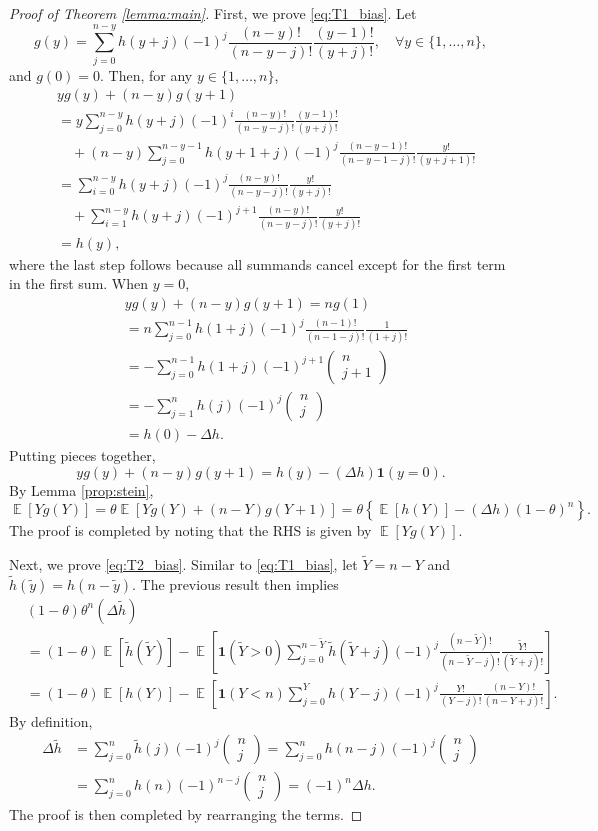 \documentclass[12pt,letterpaper]{article}
\newcommand{\com}[2]{
  \left(\begin{array}{cc}
    #1 \\ #2
  \end{array}\right)
}
\newcommand{\td}{\tilde}
\newcommand{\E}{\operatorname{\mathbb{E}}}
\begin{document}
\begin{proof}[Proof of Theorem \ref{lemma:main}]
  First, we prove \eqref{eq:T1_bias}. Let
    \[g(y) = \sum_{j=0}^{n-y}h(y + j)(-1)^{j}\frac{(n-y)!}{(n-y-j)!}\frac{(y-1)!}{(y+j)!}, \quad \forall y \in \{1, \ldots, n\},\]
    and $g(0) = 0$. Then, for any $y\in \{1, \ldots, n\}$,
    \begin{align*}
      &yg(y) + (n - y)g(y+1) \\
      & = y\sum_{j=0}^{n-y}h(y + j)(-1)^{i}\frac{(n-y)!}{(n-y-j)!}\frac{(y-1)!}{(y+j)!}\\
      & \quad + (n-y)\sum_{j=0}^{n-y-1}h(y +1 + j)(-1)^{j}\frac{(n-y-1)!}{(n-y-1-j)!}\frac{y!}{(y+j+1)!}\\
      & = \sum_{i=0}^{n-y}h(y + j)(-1)^{j}\frac{(n-y)!}{(n-y-j)!}\frac{y!}{(y+j)!}\\
      & \quad + \sum_{i=1}^{n-y}h(y + j)(-1)^{j+1}\frac{(n-y)!}{(n-y-j)!}\frac{y!}{(y+j)!}\\
      & = h(y),
    \end{align*}
    where the last step follows because all summands cancel except for the first term in the first sum. When $y = 0$,
    \begin{align*}
      &yg(y) + (n - y)g(y+1) = ng(1)\\
      & = n\sum_{j=0}^{n-1}h(1 + j)(-1)^{j}\frac{(n-1)!}{(n-1-j)!}\frac{1}{(1+j)!}\\
      & = -\sum_{j=0}^{n-1}h(1 + j)(-1)^{j+1}\com{n}{j+1}\\
      & = -\sum_{j=1}^{n}h(j)(-1)^{j}\com{n}{j}\\
      & = h(0) - \Delta h.
    \end{align*}
    Putting pieces together,
    \[yg(y) + (n - y)g(y+1) = h(y) - (\Delta h) \mathbf{1}(y = 0).\]
  By Lemma \ref{prop:stein},
  \[\E[Yg(Y)] = \theta \E[Yg(Y) + (n - Y)g(Y+1)] = \theta \left\{\E[h(Y)] - (\Delta h) (1 - \theta)^n\right\}.\]
  The proof is completed by noting that the RHS is given by $\E[Yg(Y)]$.

  Next, we prove \eqref{eq:T2_bias}. Similar to \eqref{eq:T1_bias}, let $\td{Y} = n - Y$ and $\td{h}(\td{y}) = h(n - \td{y})$. The previous result then implies
  \begin{align*}
    &(1 - \theta) \theta^n (\Delta \td{h})\\
    &= (1 - \theta) \E[\td{h}(\td{Y})] - \E\left[\mathbf{1}(\td{Y} > 0)\sum_{j=0}^{n-\td{Y}}\td{h}(\td{Y} + j)(-1)^{j}\frac{(n-\td{Y})!}{(n-\td{Y}-j)!}\frac{\td{Y}!}{(\td{Y}+j)!}\right]\\
    & = (1 - \theta) \E[h(Y)] - \E\left[\mathbf{1}(Y < n)\sum_{j=0}^{Y}h(Y - j)(-1)^{j}\frac{Y!}{(Y-j)!}\frac{(n - Y)!}{(n-Y+j)!}\right].
  \end{align*}
  By definition,
  \begin{align*}
    \Delta \td{h} &= \sum_{j=0}^{n}\td{h}(j)(-1)^{j}\com{n}{j} = \sum_{j=0}^{n}h(n-j)(-1)^{j}\com{n}{j}\\
    & = \sum_{j=0}^{n}h(n)(-1)^{n-j}\com{n}{j} = (-1)^{n}\Delta h.
  \end{align*}
  The proof is then completed by rearranging the terms.
\end{proof}
\end{document}
